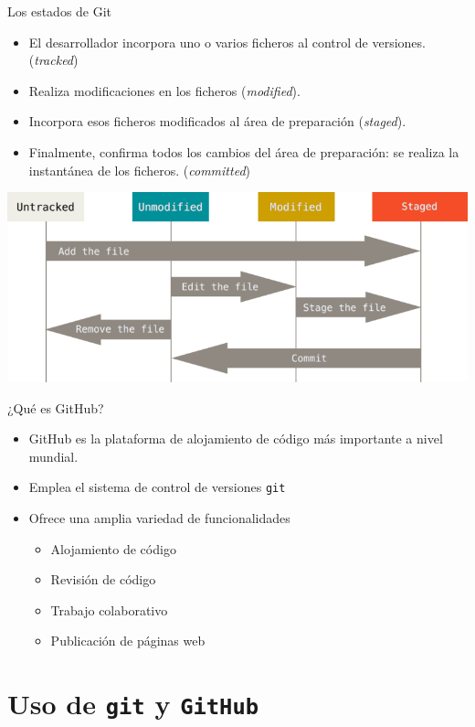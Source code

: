 \documentclass[aspectratio=169, xcolor={usenames,svgnames,dvipsnames}]{beamer}
\begin{document}
\begin{frame}[label={sec:orgf376401}]{Los estados de Git}
\begin{itemize}
\item El desarrollador incorpora uno o varios ficheros al control de versiones. (\emph{tracked})
\item Realiza modificaciones en los ficheros (\emph{modified}).
\item Incorpora esos ficheros modificados al área de preparación (\emph{staged}).
\item Finalmente, confirma todos los cambios del área de preparación: se realiza la instantánea de los ficheros. (\emph{committed})
\end{itemize}
\begin{center}
\includegraphics[height=0.4\textheight]{figs/git_estados.png}
\end{center}
\end{frame}

\begin{frame}[label={sec:org3ded9f5},fragile]{¿Qué es GitHub?}
 \begin{itemize}
\item GitHub es la plataforma de alojamiento de código más importante a nivel mundial.
\item Emplea el sistema de control de versiones \texttt{git}
\item Ofrece una amplia variedad de funcionalidades
\begin{itemize}
\item Alojamiento de código
\item Revisión de código
\item Trabajo colaborativo
\item Publicación de páginas web
\end{itemize}
\end{itemize}
\end{frame}

\section{Uso de \texttt{git} y \texttt{GitHub}}
\label{sec:org98d6add}
\end{document}
